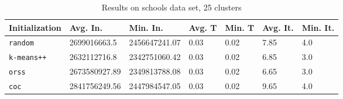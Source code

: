 \begin{table}[h]
	\begin{center}
		\begin{tabular}{|l|l|l|l|l|l|l|}
			\hline
			Initialization & Avg. In. & Min. In. & Avg. T & Min. T & Avg. It. & Min. It.\\\hline
			\texttt{random} & 2699016663.5 & 2456647241.07 & 0.03 & 0.02 & 7.85 & 4.0\\\hline
			\texttt{k-means++} & 2632112716.8 & 2342751060.42 & 0.03 & 0.02 & 6.85 & 3.0\\\hline
			\texttt{orss} & 2673580927.89 & 2349813788.08 & 0.03 & 0.02 & 6.65 & 3.0\\\hline
			\texttt{coc} & 2841756249.56 & 2447984547.05 & 0.03 & 0.02 & 9.65 & 4.0\\\hline
		\end{tabular}
		\caption{Results on schools data set, 25 clusters}
		\label{tbl:schools25}
	\end{center}
\end{table}


